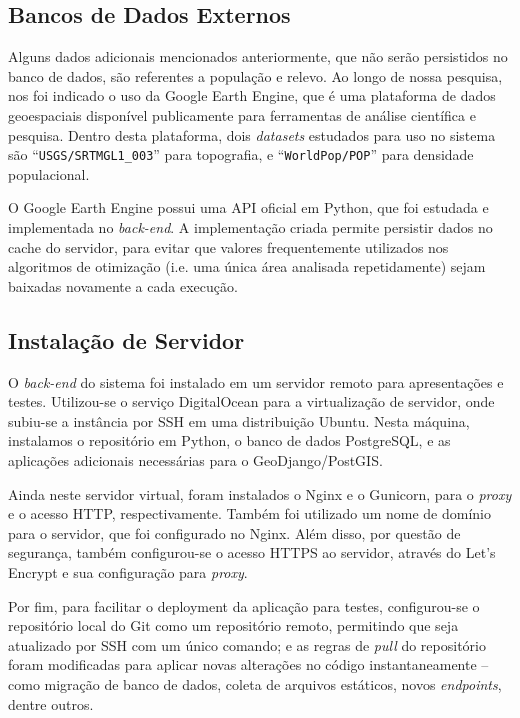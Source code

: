 \documentclass[]{politex}
\begin{document}
\subsection{Bancos de Dados Externos}

Alguns dados adicionais mencionados anteriormente, que não serão persistidos no
banco de dados, são referentes a população e relevo. Ao longo de nossa pesquisa,
nos foi indicado o uso da Google Earth Engine\cite{earthengine}, que é uma plataforma
de dados geoespaciais disponível publicamente para ferramentas de análise
científica e pesquisa. Dentro desta plataforma, dois \textit{datasets} estudados para uso no sistema
são ``\texttt{USGS/SRTMGL1\_003}'' para topografia, e ``\texttt{WorldPop/POP}''
para densidade populacional.

O Google Earth Engine possui uma API oficial em Python, que foi estudada e
implementada no \textit{back-end}. A implementação criada permite persistir dados no
cache do servidor, para evitar que valores frequentemente utilizados nos
algoritmos de otimização (i.e. uma única área analisada repetidamente) sejam baixadas
novamente a cada execução.

\subsection{Instalação de Servidor}

O \textit{back-end} do sistema foi instalado em um servidor remoto para apresentações e
testes. Utilizou-se o serviço DigitalOcean para a virtualização de servidor,
onde subiu-se a instância por SSH em uma distribuição Ubuntu. Nesta máquina,
instalamos o repositório em Python, o banco de dados PostgreSQL, e as aplicações adicionais
necessárias para o GeoDjango/PostGIS.

Ainda neste servidor virtual, foram instalados o Nginx e o Gunicorn, para o \textit{proxy} e o
acesso HTTP, respectivamente. Também foi utilizado um nome de domínio para o
servidor, que foi configurado no Nginx. Além disso, por questão de segurança,
também configurou-se o acesso HTTPS ao servidor, através do Let's Encrypt e sua
configuração para \textit{proxy}.

Por fim, para facilitar o deployment da aplicação para testes, configurou-se
o repositório local do Git como um repositório remoto, permitindo que seja
atualizado por SSH com um único comando; e as regras de \textit{pull} do
repositório foram modificadas para aplicar novas alterações no código
instantaneamente -- como migração de banco de dados, coleta de arquivos
estáticos, novos \textit{endpoints}, dentre outros.
\end{document}
